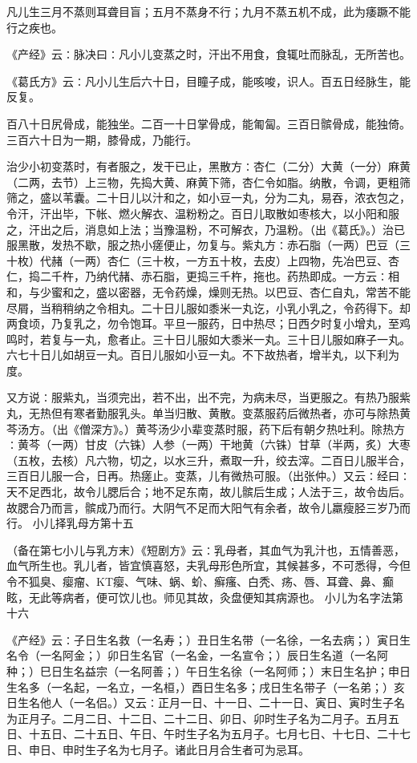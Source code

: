\documentclass[a4paper,12pt,UTF8,twoside]{ctexbook}
\begin{document}
凡儿生三月不蒸则耳聋目盲；五月不蒸身不行；九月不蒸五机不成，此为痿蹶不能行之疾也。

《产经》云∶脉决曰∶凡小儿变蒸之时，汗出不用食，食辄吐而脉乱，无所苦也。

《葛氏方》云∶凡小儿生后六十日，目瞳子成，能咳唆，识人。百五日经脉生，能反复。

百八十日尻骨成，能独坐。二百一十日掌骨成，能匍匐。三百日髌骨成，能独倚。三百六十日为一期，膝骨成，乃能行。

治少小初变蒸时，有者服之，发干已止，黑散方∶杏仁（二分）大黄（一分）麻黄（二两，去节）上三物，先捣大黄、麻黄下筛，杏仁令如脂。纳散，令调，更粗筛筛之，盛以苇囊。二十日儿以汁和之，如小豆一丸，分为二丸，易吞，浓衣包之，令汗，汗出毕，下帐、燃火解衣、温粉粉之。百日儿取散如枣核大，以小阳和服之，汗出之后，消息如上法；当豫温粉，不可解衣，乃温粉。（出《葛氏》。）治已服黑散，发热不歇，服之热小瘥便止，勿复与。紫丸方∶赤石脂（一两）巴豆（三十枚）代赭（一两）杏仁（三十枚，一方五十枚，去皮）上四物，先冶巴豆、杏仁，捣二千杵，乃纳代赭、赤石脂，更捣三千杵，拖也。药热即成。一方云∶相和，与少蜜和之，盛以密器，无令药燥，燥则无热。以巴豆、杏仁自丸，常苦不能尽屑，当稍稍纳之令相丸。二十日儿服如黍米一丸讫，小乳小乳之，令药得下。却两食顷，乃复乳之，勿令饱耳。平旦一服药，日中热尽；日西夕时复小增丸，至鸡鸣时，若复与一丸，愈者止。三十日儿服如大黍米一丸。三十日儿服如麻子一丸。六七十日儿如胡豆一丸。百日儿服如小豆一丸。不下故热者，增半丸，以下利为度。

又方说∶服紫丸，当须完出，若不出，出不完，为病未尽，当更服之。有热乃服紫丸，无热但有寒者勤服乳头。单当归散、黄散。变蒸服药后微热者，亦可与除热黄芩汤方。（出《僧深方》。）黄芩汤少小辈变蒸时服，药下后有朝夕热吐利。除热方∶黄芩（一两）甘皮（六铢）人参（一两）干地黄（六铢）甘草（半两，炙）大枣（五枚，去核）凡六物，切之，以水三升，煮取一升，绞去滓。二百日儿服半合，三百日儿服一合，日再。热瘥止。变蒸，儿有微热可服。（出张仲。）又云∶经曰∶天不足西北，故令儿腮后合；地不足东南，故儿髌后生成；人法于三，故令齿后。故腮合乃而言，髌成乃而行。大阴气不足而大阳气有余者，故令儿羸瘦胫三岁乃而行。
小儿择乳母方第十五

（备在第七小儿与乳方末）《短剧方》云∶乳母者，其血气为乳汁也，五情善恶，血气所生也。乳儿者，皆宜慎喜怒，夫乳母形色所宜，其候甚多，不可悉得，今但令不狐臭、瘿瘤、KT瘿、气味、蜗、蚧、癣瘙、白秃、疡、唇、耳聋、鼻、癫眩，无此等病者，便可饮儿也。师见其故，灸盘便知其病源也。
小儿为名字法第十六

《产经》云∶子日生名救（一名寿；）丑日生名带（一名徐，一名去病；）寅日生名令（一名阿金；）卯日生名官（一名金，一名宣令；）辰日生名道（一名阿种；）巳日生名益宗（一名阿善；）午日生名徐（一名阿师；）末日生名护；申日生名多（一名起，一名立，一名桓，）酉日生名多；戌日生名带子（一名弟；）亥日生名他人（一名侣。）又云∶正月一日、十一日、二十一日、寅日、寅时生子名为正月子。二月二日、十二日、二十二日、卯日、卯时生子名为二月子。五月五日、十五日、二十五日、午日、午时生子名为五月子。七月七日、十七日、二十七日、申日、申时生子名为七月子。诸此日月合生者可为忌耳。
\end{document}
